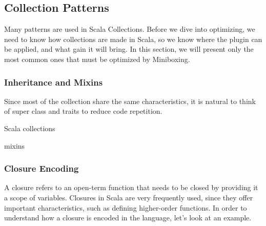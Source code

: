 % 
% 
% 
% 
% 

\subsection{Collection Patterns}

Many patterns are used in Scala Collections. Before we dive into optimizing, we need to know how collections are made in Scala, so we know where the plugin can be applied, and what gain it will bring. In this section, we will present only the most common ones that must be optimized by Miniboxing. 


\subsubsection{Inheritance and Mixins}

 Since most of the collection share the same characteristics, it is natural to think of super class and traits to reduce code repetition.

Scala collections 

mixins \cite{scalable-component-abstractions}

\subsubsection{Closure Encoding}

A closure refers to an open-term function that needs to be closed by providing it a scope of variables. Closures in Scala are very frequently used, since they offer important characteristics, such as defining higher-order functions. In order to understand how a closure is encoded in the language, let's look at an example.

